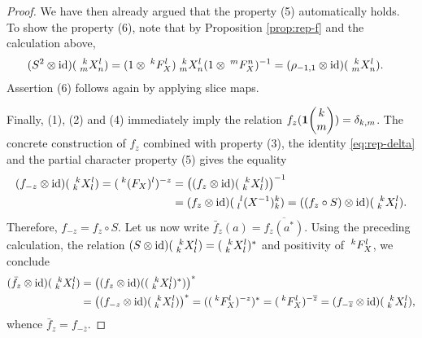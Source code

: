 \begin{proof}
We have then already argued that the property (5) automatically holds. To show the property (6), note that by Proposition \ref{prop:rep-f} and the calculation above,
    \begin{align*}
      (S^{2} \otimes \id)(\Gr{X}{k}{l}{m}{n}) &= (1
      \otimes\Gru{F_{X}}{k}{l})
      \Gr{X}{k}{l}{m}{n}(1 \otimes \Gru{F_{X}}{m}{n})^{-1} 
      =(\rho_{-1,1}  \otimes \id)(\Gr{X}{k}{l}{m}{n}).
    \end{align*}
     Assertion (6) follows again by applying slice maps.
    
     Finally, (1), (2) and (4)
     immediately imply the relation
     $f_{z}(\UnitC{k}{m})=\delta_{k,m}$. The concrete construction of $f_z$ combined with property (3), the identity \eqref{eq:rep-delta} and the partial character property (5) gives the equality
     \begin{align*}
       (f_{-z} \otimes \id) (\Gr{X}{k}{l}{k}{l})=
       (\Gru{(F_{X})}{k}{l})^{-z} &=\left( (f_{z} \otimes
       \id)(\Gr{X}{k}{l}{k}{l})\right)^{-1} \\ &= (f_{z} \otimes
       \id)(\Gr{(X^{-1})}{l}{k}{l}{k}) = ((f_{z} \circ S) \otimes
       \id)(\Gr{X}{k}{l}{k}{l}).
     \end{align*}
Therefore, $f_{-z} = f_{z} \circ S$. Let us now write $\bar{f}_z(a) = \overline{f_z(a^*)}$. Using the preceding calculation,
     the relation $(S \otimes \id)(\Gr{X}{k}{l}{k}{l}) =
     (\Gr{X}{k}{l}{k}{l})^{*}$ and positivity of $\Gru{F_{X}}{k}{l}$,
     we conclude
     \begin{align*}
       (\bar{f}_z \otimes
       \id)(\Gr{X}{k}{l}{k}{l})
&=       \left((f_{z} \otimes
       \id)((\Gr{X}{k}{l}{k}{l})^{*})\right)^{*} \\
& = \left((f_{-z} \otimes \id)(\Gr{X}{k}{l}{k}{l})\right)^{*} 
 =
((\Gru{F_{X}}{k}{l})^{-z})^{*} 
=       (\Gru{F_{X}}{k}{l})^{-\overline{z}} = (f_{-\overline{z}}
\otimes \id)(\Gr{X}{k}{l}{k}{l}),
     \end{align*}
whence $\bar{f}_z = f_{-\overline{z}}$.
\end{proof}


